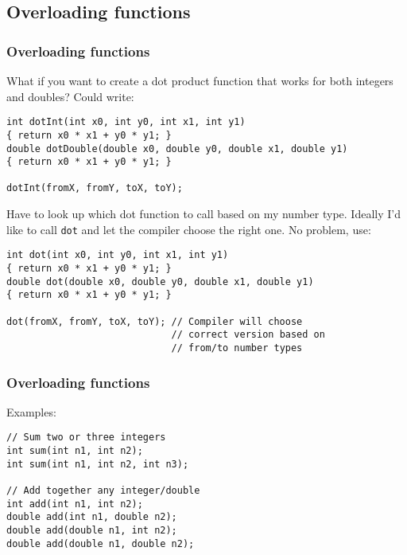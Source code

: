 \documentclass{beamer}
\begin{document}
\subsection{Overloading functions}

\begin{frame}[fragile]
  \frametitle{Overloading functions}
  
  What if you want to create a dot product function that works for both integers and doubles?  Could write:
  \begin{lstlisting}
int dotInt(int x0, int y0, int x1, int y1)
{ return x0 * x1 + y0 * y1; }
double dotDouble(double x0, double y0, double x1, double y1)
{ return x0 * x1 + y0 * y1; }

dotInt(fromX, fromY, toX, toY);
  \end{lstlisting}
  Have to look up which dot function to call based on my number type. Ideally I'd like to call \texttt{dot} and let the compiler choose the right one.
  \newline\pause
  No problem, use:
  \begin{lstlisting}[belowskip=0pt]
int dot(int x0, int y0, int x1, int y1)
{ return x0 * x1 + y0 * y1; }
double dot(double x0, double y0, double x1, double y1)
{ return x0 * x1 + y0 * y1; }

dot(fromX, fromY, toX, toY); // Compiler will choose
                             // correct version based on
                             // from/to number types
  \end{lstlisting}
\end{frame}

\begin{frame}[fragile]
  \frametitle{Overloading functions}
  
  \pause
  Examples:
  \begin{lstlisting}
// Sum two or three integers
int sum(int n1, int n2);
int sum(int n1, int n2, int n3);

// Add together any integer/double
int add(int n1, int n2);
double add(int n1, double n2);
double add(double n1, int n2);
double add(double n1, double n2);
  \end{lstlisting}  

\end{frame}

\subtitle{Inbuilt math functions}
\end{document}
